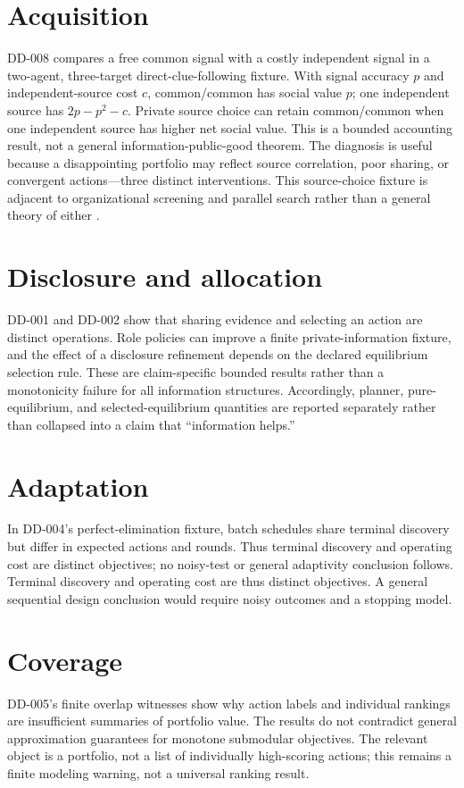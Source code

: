 \documentclass[11pt]{article}
\begin{document}
\section{Acquisition}
DD-008 compares a free common signal with a costly independent signal in a
two-agent, three-target direct-clue-following fixture. With signal accuracy $p$
and independent-source cost $c$, common/common has social value $p$; one
independent source has $2p-p^2-c$. Private source choice can retain common/common
when one independent source has higher net social value. This is a bounded
accounting result, not a general information-public-good theorem.
The diagnosis is useful because a disappointing portfolio may reflect source
correlation, poor sharing, or convergent actions---three distinct interventions.
This source-choice fixture is adjacent to organizational screening and parallel
search rather than a general theory of either
\citep{SahStiglitz1986,KormanRodeh2020}.
\section{Disclosure and allocation}
DD-001 and DD-002 show that sharing evidence and selecting an action are distinct
operations. Role policies can improve a finite private-information fixture, and
the effect of a disclosure refinement depends on the declared equilibrium
selection rule. These are claim-specific bounded results rather than a
monotonicity failure for all information structures.
Accordingly, planner, pure-equilibrium, and selected-equilibrium quantities are
reported separately rather than collapsed into a claim that ``information helps.''
\section{Adaptation}
In DD-004's perfect-elimination fixture, batch schedules share terminal discovery
but differ in expected actions and rounds. Thus terminal discovery and operating
cost are distinct objectives; no noisy-test or general adaptivity conclusion
follows.
Terminal discovery and operating cost are thus distinct objectives. A general
sequential design conclusion would require noisy outcomes and a stopping model.
\section{Coverage}
DD-005's finite overlap witnesses show why action labels and individual rankings
are insufficient summaries of portfolio value. The results do not contradict
general approximation guarantees for monotone submodular objectives.
The relevant object is a portfolio, not a list of individually high-scoring
actions; this remains a finite modeling warning, not a universal ranking result.
\end{document}
